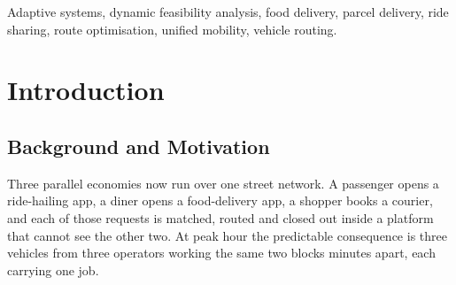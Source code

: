 \documentclass[conference]{IEEEtran}
\begin{document}
\begin{abstract}
Ride-hailing, food delivery and parcel courier platforms move vehicles over the same street network but plan in isolation, so three vehicles are often dispatched where one coordinated trip would do. This paper presents a unified pipeline built around a Dynamic Multi-Service Feasibility Engine (DMFE), which decides whether a passenger ride, a food order and a parcel drop can share a vehicle before any driver is committed or any route is planned. Candidate pairs are scored on pickup proximity, route similarity, time-window overlap, vehicle capacity and request priority; admitted batches are assigned by a five-factor driver selector and then routed by a constraint solver. An adaptive mode recomputes the scoring weights each dispatch cycle from operating context and from bounded corrections derived from completed-trip residuals. Evaluation used reproducible synthetic workloads of 50, 100, 250 and 500 requests over 36 seed-matched runs with a fixed 60-vehicle fleet, against an independent-dispatch baseline. Where both configurations served the same requests, batching cut dispatched trips by 36.8\% and 40.4\% and raised mean vehicle utilisation by 17.0 and 17.4 percentage points, at mean service delays of 5.8 and 6.1 minutes against a 20-minute cap. Consolidation within the assigned fleet lowered estimated CO$_2$ by 22.0\% to 43.9\% against serving the same requests unbatched. The adaptive mode improved consolidation at every workload and raised mean pair compatibility from 55.4 to 59.2. The evaluation is synthetic and single-region. The adaptive layer utilizes a bounded residual correction, which was empirically validated to improve batch compatibility. The gradient-based learning formulation is a proposed extension.
\end{abstract}

\begin{IEEEkeywords}
Adaptive systems, dynamic feasibility analysis, food delivery, parcel delivery, ride sharing, route optimisation, unified mobility, vehicle routing.
\end{IEEEkeywords}

\section{Introduction}
\subsection{Background and Motivation}
Three parallel economies now run over one street network. A passenger opens a ride-hailing app, a diner opens a food-delivery app, a shopper books a courier, and each of those requests is matched, routed and closed out inside a platform that cannot see the other two. At peak hour the predictable consequence is three vehicles from three operators working the same two blocks minutes apart, each carrying one job.
\end{document}
